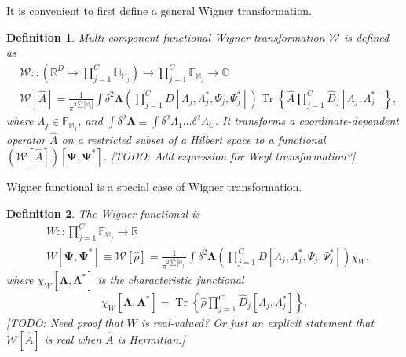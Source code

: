 \documentclass[12pt,aip,jmp,amssymb,amsmath]{revtex4-1}
\newtheorem{definition}{Definition}
\begin{document}
It is convenient to first define a general Wigner transformation.

\begin{definition}
\label{def:func-wigner:w-transformation}
    Multi-component functional Wigner transformation $\mathcal{W}$ is defined as
    \begin{equation*}\begin{split}
    &    \mathcal{W} :: \left( \mathbb{R}^D \rightarrow \prod_{j=1}^C \mathbb{H}_{\mathbb{M}_j} \right)
            \rightarrow \prod_{j=1}^C \mathbb{F}_{\mathbb{M}_j}
            \rightarrow \mathbb{C} \\
    &    \mathcal{W}[\hat{A}]
        = \frac{1}{\pi^{2 \sum|\mathbb{M}_j|}} \int \delta^2 \boldsymbol{\Lambda}
            \left( \prod_{j=1}^C D[\Lambda_j, \Lambda_j^*, \Psi_j, \Psi_j^*] \right)
            \operatorname{Tr} \left\{ \hat{A} \prod_{j=1}^C \hat{D}_j[\Lambda_j, \Lambda_j^*] \right\},
    \end{split}\end{equation*}
    where $\Lambda_j \in \mathbb{F}_{\mathbb{M}_j}$, and $\int \delta^2 \boldsymbol{\Lambda} \equiv \int \delta^2 \Lambda_1 \ldots \delta^2 \Lambda_C$.
    It transforms a coordinate-dependent operator $\hat{A}$ on a restricted subset of a Hilbert space to a functional $(\mathcal{W}[\hat{A}])[\boldsymbol{\Psi}, \boldsymbol{\Psi}^*]$.
    [TODO: Add expression for Weyl transformation?]
\end{definition}

Wigner functional is a special case of Wigner transformation.

\begin{definition}
\label{def:func-wigner:w-functional}
    The Wigner functional is
    \begin{equation*}\begin{split}
    &    W :: \prod_{j=1}^C \mathbb{F}_{\mathbb{M}_j} \rightarrow \mathbb{R} \\
    &    W [\boldsymbol{\Psi}, \boldsymbol{\Psi}^*]
        \equiv \mathcal{W}[\hat{\rho}]
        = \frac{1}{\pi^{2 \sum|\mathbb{M}_j|}} \int \delta^2 \boldsymbol{\Lambda}
            \left( \prod_{j=1}^C D[\Lambda_j, \Lambda_j^*, \Psi_j, \Psi_j^*] \right) \chi_W,
    \end{split}\end{equation*}
    where $\chi_W [\boldsymbol{\Lambda}, \boldsymbol{\Lambda}^*]$ is the characteristic functional
    \begin{equation*}\begin{split}
        \chi_W [\boldsymbol{\Lambda}, \boldsymbol{\Lambda}^*]
        = \operatorname{Tr} \left\{ \hat{\rho} \prod_{j=1}^C \hat{D}_j[\Lambda_j, \Lambda_j^*] \right\}.
    \end{split}\end{equation*}
    [TODO: Need proof that $W$ is real-valued?
    Or just an explicit statement that $\mathcal{W}[\hat{A}]$ is real when $\hat{A}$ is Hermitian.]
\end{definition}
\end{document}
